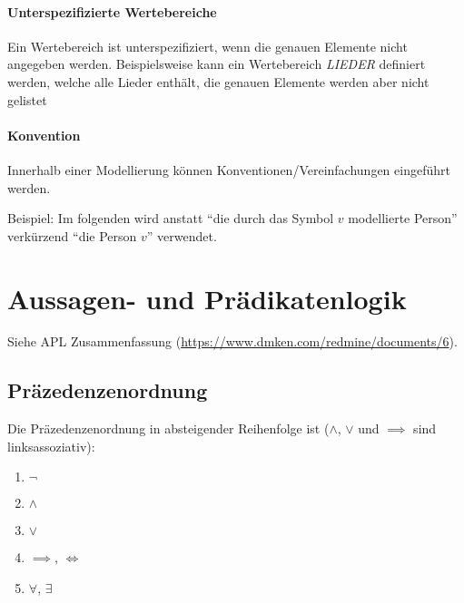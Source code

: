 
							\paragraph{Unterspezifizierte Wertebereiche}
								Ein Wertebereich ist unterspezifiziert, wenn die genauen Elemente nicht angegeben werden. Beispielsweise kann ein Wertebereich \textit{LIEDER} definiert werden, welche alle Lieder enthält, die genauen Elemente werden aber nicht gelistet

							\paragraph{Konvention}
								Innerhalb einer Modellierung können Konventionen/Vereinfachungen eingeführt werden.

								Beispiel: Im folgenden wird anstatt \enquote{die durch das Symbol $ v $ modellierte Person} verkürzend \enquote{die Person $ v $} verwendet.

						\section{Aussagen- und Prädikatenlogik}
							Siehe APL Zusammenfassung (\url{https://www.dmken.com/redmine/documents/6}).

							\subsection{Präzedenzenordnung}
								Die Präzedenzenordnung in absteigender Reihenfolge ist ($ \land $, $ \lor $ und $ \implies $ sind linksassoziativ):
								\begin{enumerate}
									\item $ \lnot $
									\item $ \land $
									\item $ \lor $
									\item $ \implies $, $ \iff $
									\item $ \forall $, $ \exists $
								\end{enumerate}

